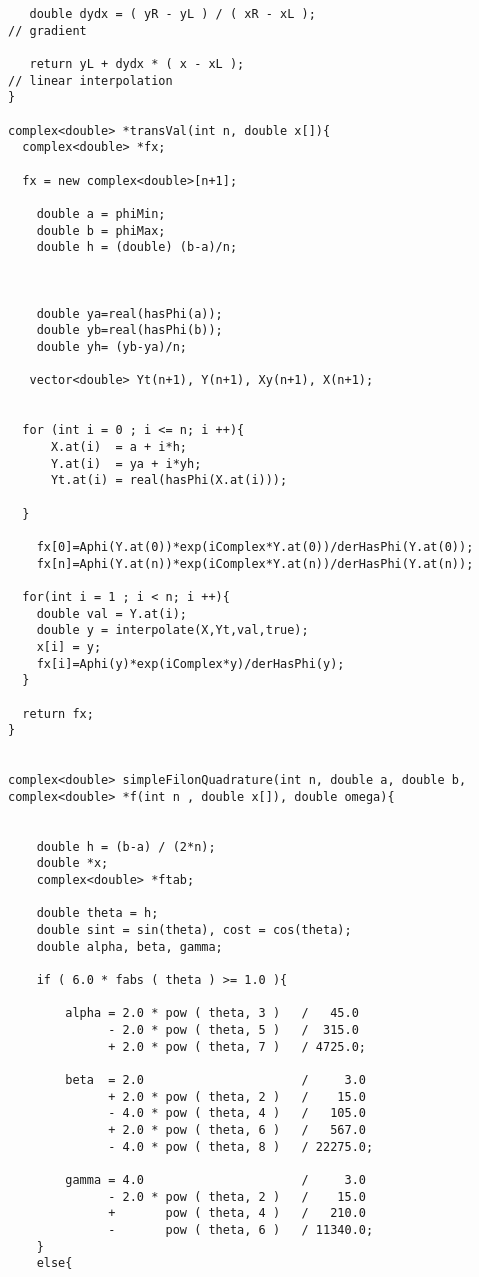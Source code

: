 \begin{lstlisting}
   double dydx = ( yR - yL ) / ( xR - xL );                                    // gradient

   return yL + dydx * ( x - xL );                                              // linear interpolation
}

complex<double> *transVal(int n, double x[]){
  complex<double> *fx;
  
  fx = new complex<double>[n+1];

    double a = phiMin;
    double b = phiMax;
    double h = (double) (b-a)/n; 

   

    double ya=real(hasPhi(a));
    double yb=real(hasPhi(b));
    double yh= (yb-ya)/n;

   vector<double> Yt(n+1), Y(n+1), Xy(n+1), X(n+1);

    
  for (int i = 0 ; i <= n; i ++){
      X.at(i)  = a + i*h; 
      Y.at(i)  = ya + i*yh;
      Yt.at(i) = real(hasPhi(X.at(i)));
      
  }
     
    fx[0]=Aphi(Y.at(0))*exp(iComplex*Y.at(0))/derHasPhi(Y.at(0));
    fx[n]=Aphi(Y.at(n))*exp(iComplex*Y.at(n))/derHasPhi(Y.at(n)); 

  for(int i = 1 ; i < n; i ++){
    double val = Y.at(i); 
    double y = interpolate(X,Yt,val,true); 
    x[i] = y;
    fx[i]=Aphi(y)*exp(iComplex*y)/derHasPhi(y); 
  }

  return fx;
}


complex<double> simpleFilonQuadrature(int n, double a, double b, complex<double> *f(int n , double x[]), double omega){


    double h = (b-a) / (2*n);
    double *x;
    complex<double> *ftab;

    double theta = h;
    double sint = sin(theta), cost = cos(theta);
    double alpha, beta, gamma;
    
    if ( 6.0 * fabs ( theta ) >= 1.0 ){

        alpha = 2.0 * pow ( theta, 3 )   /   45.0 
              - 2.0 * pow ( theta, 5 )   /  315.0 
              + 2.0 * pow ( theta, 7 )   / 4725.0;
    
        beta  = 2.0                      /     3.0 
              + 2.0 * pow ( theta, 2 )   /    15.0 
              - 4.0 * pow ( theta, 4 )   /   105.0 
              + 2.0 * pow ( theta, 6 )   /   567.0 
              - 4.0 * pow ( theta, 8 )   / 22275.0;

        gamma = 4.0                      /     3.0 
              - 2.0 * pow ( theta, 2 )   /    15.0 
              +       pow ( theta, 4 )   /   210.0 
              -       pow ( theta, 6 )   / 11340.0;
    }
    else{
         

\end{lstlisting}
